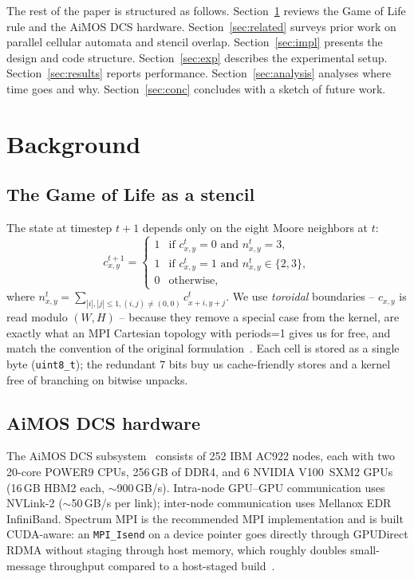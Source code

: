 \documentclass[sigconf,nonacm,10pt]{acmart}
\begin{document}
The rest of the paper is structured as follows. Section~\ref{sec:bg}
reviews the Game of Life rule and the AiMOS DCS hardware.
Section~\ref{sec:related} surveys prior work on parallel cellular
automata and stencil overlap. Section~\ref{sec:impl} presents the
design and code structure. Section~\ref{sec:exp} describes the
experimental setup. Section~\ref{sec:results} reports performance.
Section~\ref{sec:analysis} analyses where time goes and why.
Section~\ref{sec:conc} concludes with a sketch of future work.

\section{Background}\label{sec:bg}

\subsection{The Game of Life as a stencil}

The state at timestep $t+1$ depends only on the eight Moore neighbors
at $t$:
\[
c_{x,y}^{t+1} = \begin{cases}
1 & \text{if } c_{x,y}^{t}=0 \text{ and } n_{x,y}^{t}=3,\\
1 & \text{if } c_{x,y}^{t}=1 \text{ and } n_{x,y}^{t}\in\{2,3\},\\
0 & \text{otherwise},
\end{cases}
\]
where $n_{x,y}^{t} = \sum_{|i|,|j|\le 1, (i,j)\ne(0,0)} c_{x+i,y+j}^{t}$.
We use \emph{toroidal} boundaries -- $c_{x,y}$ is read modulo
$(W,H)$ -- because they remove a special case from the kernel, are
exactly what an MPI Cartesian topology with periods=1 gives us for
free, and match the convention of the original
formulation~\cite{gardner1970}. Each cell is stored as a single byte
(\texttt{uint8\_t}); the redundant 7 bits buy us cache-friendly stores
and a kernel free of branching on bitwise unpacks.

\subsection{AiMOS DCS hardware}

The AiMOS DCS subsystem~\cite{aimosdocs} consists of 252 IBM AC922 nodes,
each with two 20-core POWER9 CPUs, 256\,GB of DDR4, and 6 NVIDIA
V100~SXM2 GPUs (16\,GB HBM2 each, $\sim$900\,GB/s). Intra-node
GPU--GPU communication uses NVLink-2 ($\sim$50\,GB/s per link);
inter-node communication uses Mellanox EDR InfiniBand. Spectrum MPI
is the recommended MPI implementation and is built CUDA-aware: an
\texttt{MPI\_Isend} on a device pointer goes directly through GPUDirect
RDMA without staging through host memory, which roughly doubles
small-message throughput compared to a host-staged build~\cite{wang2014mpicuda}.
\end{document}
